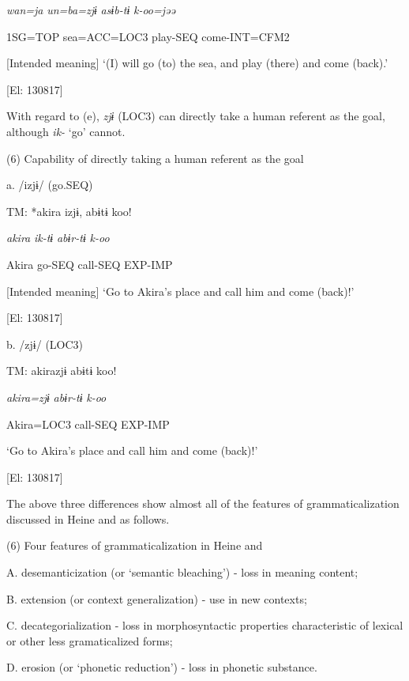       \textit{wan=ja}  \textit{un=ba=zjɨ}  \textit{asɨb-tɨ}  \textit{k-oo=jəə}

      1SG=TOP  sea=ACC=LOC3  play-SEQ  come-INT=CFM2

      [Intended meaning] ‘(I) will go (to) the sea, and play (there) and come (back).’

    [El: 130817]

With regard to (e), \textit{zjɨ} (LOC3) can directly take a human referent as the goal, although \textit{ik-} ‘go’ cannot.

(6)  Capability of directly taking a human referent as the goal

  a.  /izjɨ/ (go.SEQ)

    TM:  *akira  izjɨ,  abɨtɨ  koo!

      \textit{akira}  \textit{ik-tɨ}  \textit{abɨr-tɨ}  \textit{k-oo}

      Akira  go-SEQ  call-SEQ  EXP-IMP

       [Intended meaning] ‘Go to Akira’s place and call him and come (back)!’

      [El: 130817]

  b.  /zjɨ/ (LOC3)

    TM:  akirazjɨ  abɨtɨ  koo!

      \textit{akira=zjɨ}  \textit{abɨr-tɨ}  \textit{k-oo}

      Akira=LOC3  call-SEQ  EXP-IMP

       ‘Go to Akira’s place and call him and come (back)!’

      [El: 130817]

The above three differences show almost all of the features of grammaticalization discussed in Heine and \citet[2]{Kuteva2002} as follows.

(6) Four features of grammaticalization in Heine and \citet[2]{Kuteva2002}

A.  desemanticization (or ‘semantic bleaching’) - loss in meaning content;

B.  extension (or context generalization) - use in new contexts;

C.    decategorialization - loss in morphosyntactic properties characteristic of lexical or other less gramaticalized forms;

D.  erosion (or ‘phonetic reduction’) - loss in phonetic substance.

